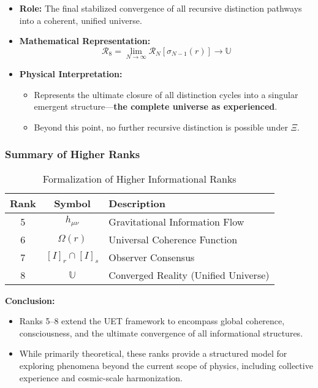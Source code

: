 \documentclass[12pt,a4paper]{article}
\begin{document}
\begin{itemize}
    \item \textbf{Role:} The final stabilized convergence of all recursive distinction pathways into a coherent, unified universe.
    \item \textbf{Mathematical Representation:}
    \[
    \mathcal{R}_8 = \lim_{N \to \infty} \mathcal{R}_N[\sigma_{N-1}(r)] \to \mathbb{U}
    \]
    \item \textbf{Physical Interpretation:} 
    \begin{itemize}
        \item Represents the ultimate closure of all distinction cycles into a singular emergent structure—\textbf{the complete universe as experienced}.
        \item Beyond this point, no further recursive distinction is possible under \(\Xi\).
    \end{itemize}
\end{itemize}

\subsubsection*{Summary of Higher Ranks}

\begin{table}[h]
\centering
\begin{tabular}{|c|c|l|}
\hline
\textbf{Rank} & \textbf{Symbol} & \textbf{Description} \\
\hline
5 & \(h_{\mu\nu}\) & Gravitational Information Flow \\
6 & \(\Omega(r)\) & Universal Coherence Function \\
7 & \([I]_r \cap [I]_s\) & Observer Consensus \\
8 & \(\mathbb{U}\) & Converged Reality (Unified Universe) \\
\hline
\end{tabular}
\caption{Formalization of Higher Informational Ranks}
\end{table}

\textbf{Conclusion:}
\begin{itemize}
    \item Ranks 5–8 extend the UET framework to encompass global coherence, consciousness, and the ultimate convergence of all informational structures.
    \item While primarily theoretical, these ranks provide a structured model for exploring phenomena beyond the current scope of physics, including collective experience and cosmic-scale harmonization.
\end{itemize}
\end{document}

